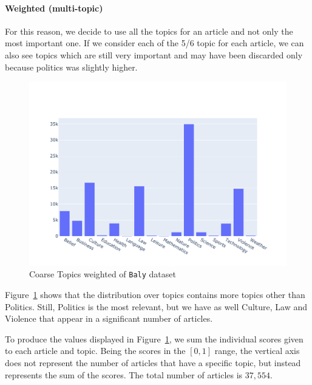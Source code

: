 \paragraph{Weighted (multi-topic)}

For this reason, we decide to use all the topics for an article and not only the most important one.
If we consider each of the 5/6 topic for each article, we can also see topics which are still very important and may have been discarded only because politics was slightly higher.

\begin{figure}[!htbp]
    \centering
    \includegraphics[width=\linewidth]{figures/baly_coarse_weighted.pdf}
    \caption{Coarse Topics weighted of \texttt{Baly} dataset}
    \label{fig:baly_coarse_weighted}
\end{figure}

Figure~\ref{fig:baly_coarse_weighted} 
shows that the distribution over topics contains more topics other than Politics.
Still, Politics is the most relevant, but we have as well Culture, Law and Violence that appear in a significant number of articles.

To produce the values displayed in Figure~\ref{fig:baly_coarse_weighted}, we sum the individual scores given to each article and topic. Being the scores in the $[0,1]$ range, the vertical axis does not represent the number of articles that have a specific topic, but instead represents the sum of the scores. The total number of articles is $37,554$.

